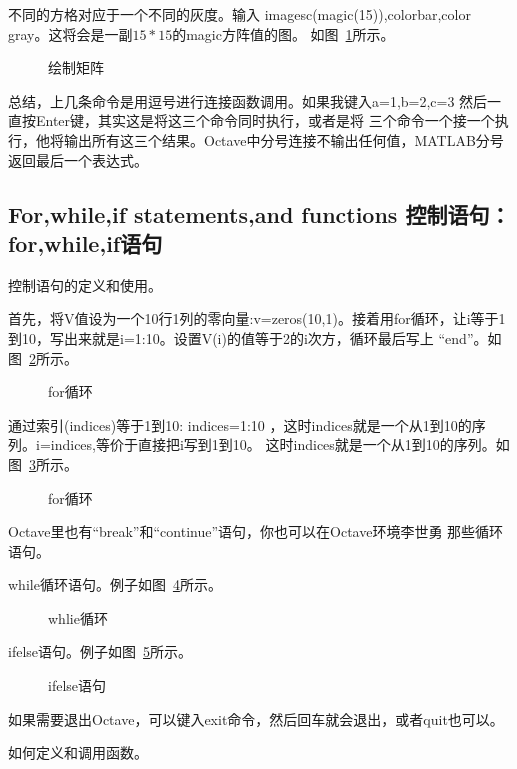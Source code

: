 \documentclass[UTF8]{ctexart}
\begin{document}
不同的方格对应于一个不同的灰度。输入 imagesc(magic(15)),colorbar,color gray。这将会是一副$15*15$的magic方阵值的图。
如图~\ref{fig:31}所示。
\begin{figure}[H]
 \caption{绘制矩阵}
 \label{fig:31}
\end{figure}

总结，上几条命令是用逗号进行连接函数调用。如果我键入a=1,b=2,c=3 然后一直按Enter键，其实这是将这三个命令同时执行，或者是将
三个命令一个接一个执行，他将输出所有这三个结果。Octave中分号连接不输出任何值，MATLAB分号返回最后一个表达式。

\subsection{For,while,if statements,and functions 控制语句：for,while,if语句}
控制语句的定义和使用。

首先，将V值设为一个10行1列的零向量:v=zeros(10,1)。接着用for循环，让i等于1到10，写出来就是i=1:10。设置V(i)的值等于2的i次方，循环最后写上
``end''。如图~\ref{fig:32}所示。
\begin{figure}[H]
 \caption{for循环}
 \label{fig:32}
\end{figure}

通过索引(indices)等于1到10: indices=1:10 ，这时indices就是一个从1到10的序列。i=indices,等价于直接把i写到1到10。
这时indices就是一个从1到10的序列。如图~\ref{fig:33}所示。
\begin{figure}[H]
 \caption{for循环}
 \label{fig:33}
\end{figure}

Octave里也有``break''和``continue''语句，你也可以在Octave环境李世勇 那些循环语句。

while循环语句。例子如图~\ref{fig:34}所示。
\begin{figure}[H]
 \caption{whlie循环}
 \label{fig:34}
\end{figure}

if\-else语句。例子如图~\ref{fig:35}所示。
\begin{figure}[H]
 \caption{if\-else语句}
 \label{fig:35}
\end{figure}

如果需要退出Octave，可以键入exit命令，然后回车就会退出，或者quit也可以。

如何定义和调用函数。
\end{document}
